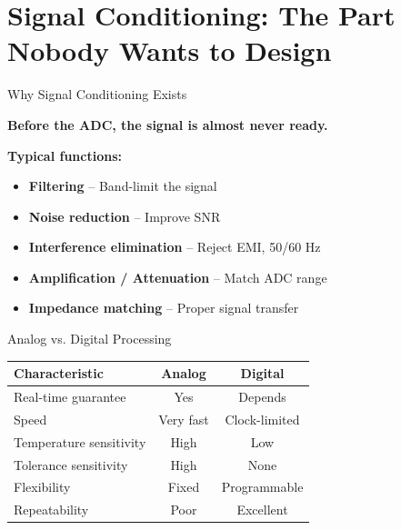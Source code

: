 \documentclass[aspectratio=169,11pt]{beamer}
\begin{document}
\section{Signal Conditioning: The Part Nobody Wants to Design}

\begin{frame}{Why Signal Conditioning Exists}
    \begin{center}
        \Large
        \textbf{Before the ADC, the signal is almost never ready.}
    \end{center}
    
    \vspace{0.5cm}
    \textbf{Typical functions:}
    \begin{itemize}
        \item \textbf{Filtering} -- Band-limit the signal
        \item \textbf{Noise reduction} -- Improve SNR
        \item \textbf{Interference elimination} -- Reject EMI, 50/60 Hz
        \item \textbf{Amplification / Attenuation} -- Match ADC range
        \item \textbf{Impedance matching} -- Proper signal transfer
    \end{itemize}
    
    \vspace{0.3cm}
    \footnotesize
    \cite{kester2005data}
\end{frame}

\begin{frame}{Analog vs. Digital Processing}
    \begin{table}
        \centering
        \begin{tabular}{lcc}
            \toprule
            \textbf{Characteristic} & \textbf{Analog} & \textbf{Digital} \\
            \midrule
            Real-time guarantee & Yes & Depends \\
            Speed & Very fast & Clock-limited \\
            Temperature sensitivity & High & Low \\
            Tolerance sensitivity & High & None \\
            Flexibility & Fixed & Programmable \\
            Repeatability & Poor & Excellent \\
            \bottomrule
        \end{tabular}
    \end{table}
    
    \vspace{0.3cm}
    \footnotesize
    \cite{razavi2021analog}
\end{frame}
\end{document}
